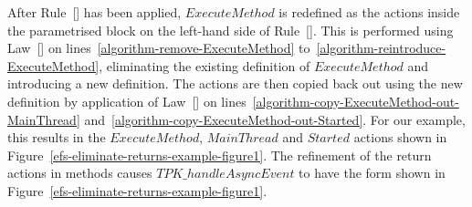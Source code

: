 After Rule~[] has been applied,
$ExecuteMethod$ is redefined as the actions inside the parametrised
block on the left-hand side of
Rule~[].
This is performed using Law~[] on
lines~\ref{algorithm-remove-ExecuteMethod}
to~\ref{algorithm-reintroduce-ExecuteMethod}, eliminating the existing
definition of $ExecuteMethod$ and introducing a new definition.
The actions are then copied back out using the new definition by
application of Law~[] on
lines~\ref{algorithm-copy-ExecuteMethod-out-MainThread}
and~\ref{algorithm-copy-ExecuteMethod-out-Started}.
For our example, this results in the $ExecuteMethod$, $MainThread$ and
$Started$ actions shown in
Figure~\ref{efs-eliminate-returns-example-figure1}.
The refinement of the return actions in methods causes
$TPK\_handleAsyncEvent$ to have the form shown in
Figure~\ref{efs-eliminate-returns-example-figure1}.

